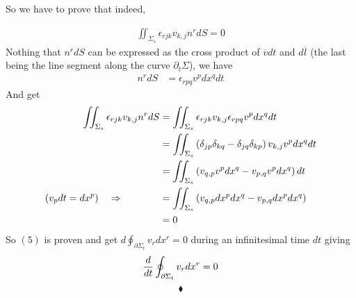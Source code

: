 So we have to prove that indeed,

\begin{align}\iint_{\Sigma_{s}}\epsilon_{rjk}v_{k,j}n^rdS=0\end{align}
Nothing that $n^rdS$ can be expressed as the cross product of $\overline{v}dt$ and $d\overline{l}$ (the last being the line segment along the curve $\partial_t\Sigma$), we have  
\begin{align}
n^rdS&= \epsilon_{rpq}v^pdx^qdt
\end{align}
And get
\begin{align}
\iint_{\Sigma_{s}}\epsilon_{rjk}v_{k,j}n^rdS&= \iint_{\Sigma_{s}}\epsilon_{rjk}v_{k,j}\epsilon_{rpq}v^pdx^qdt\\
&= \iint_{\Sigma_{s}}\left(\delta_{jp}\delta_{kq}-\delta_{jq}\delta_{kp}\right)v_{k,j}v^pdx^qdt\\
&= \iint_{\Sigma_{s}}\left(v_{q,p}v^pdx^q-v_{p,q}v^pdx^q\right)dt\\\left(v_pdt = dx^p\right)\quad\Rightarrow\quad\quad\quad\quad
&= \iint_{\Sigma_{s}}\left(v_{q,p}dx^pdx^q-v_{p,q}dx^pdx^q\right)\\
&=0
\end{align}
So $(5)$ is proven and get $d\oint_{\partial\Sigma_{t}} v_rdx^r=0$ during an infinitesimal time $dt$ giving 
$$\dv{}{t}\oint_{\partial\Sigma_{t}} v_rdx^r=0$$
 $$\blacklozenge$$
\newpage


